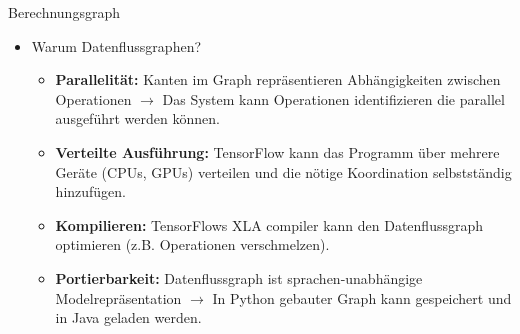 \documentclass[utf8, smaller, c]{beamer}
\begin{document}
\begin{frame}{Berechnungsgraph}
	\framebreak
	
	\begin{itemize}
		\item Warum Datenflussgraphen?
		\begin{itemize}
			\item \textbf{Parallelität:} Kanten im Graph repräsentieren Abhängigkeiten zwischen Operationen $\rightarrow$ Das System kann Operationen identifizieren die parallel ausgeführt werden können.
			\item \textbf{Verteilte Ausführung:} TensorFlow kann das Programm über mehrere Geräte (CPUs, GPUs) verteilen und die nötige Koordination selbstständig hinzufügen.
			\item \textbf{Kompilieren:} TensorFlows XLA compiler kann den Datenflussgraph optimieren (z.B. Operationen verschmelzen).
			\item \textbf{Portierbarkeit:} Datenflussgraph ist sprachen-unabhängige Modelrepräsentation $\rightarrow$ In Python gebauter Graph kann gespeichert und in Java geladen werden.
		\end{itemize}
	\end{itemize}
\end{frame}

\end{document}
